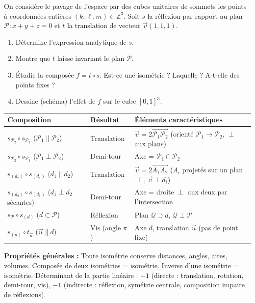 \documentclass[11pt]{article}
\begin{document}
\begin{exercice}
On considère le pavage de l'espace par des cubes unitaires de sommets les points à coordonnées entières $(k,\ell,m)\in\mathbb{Z}^3$. Soit $s$ la réflexion par rapport au plan $\mathcal{P}: x+y+z=0$ et $t$ la translation de vecteur $\vec{v}(1,1,1)$.
\begin{enumerate}
\item Détermine l'expression analytique de $s$.
\item Montre que $t$ laisse invariant le plan $\mathcal{P}$.
\item Étudie la composée $f = t \circ s$. Est-ce une isométrie ? Laquelle ? A-t-elle des points fixes ?
\item Dessine (schéma) l'effet de $f$ sur le cube $[0,1]^3$.
\end{enumerate}
\end{exercice}

\begin{aretenir}
\begin{center}
\begin{tabularx}{\linewidth}{|l|X|X|}\hline
\textbf{Composition} & \textbf{Résultat} & \textbf{Éléments caractéristiques} \\ \hline
$s_{\mathcal{P}_2} \circ s_{\mathcal{P}_1}$ ($\mathcal{P}_1\parallel\mathcal{P}_2$) & Translation & $\vec{v} = 2\overrightarrow{\mathcal{P}_1\mathcal{P}_2}$ (orienté $\mathcal{P}_1\to\mathcal{P}_2$, $\perp$ aux plans) \\ \hline
$s_{\mathcal{P}_2} \circ s_{\mathcal{P}_1}$ ($\mathcal{P}_1\perp\mathcal{P}_2$) & Demi-tour & Axe = $\mathcal{P}_1 \cap \mathcal{P}_2$ \\ \hline
$s_{(d_2)} \circ s_{(d_1)}$ ($d_1\parallel d_2$) & Translation & $\vec{v} = 2\overrightarrow{A_1A_2}$ ($A_i$ projetés sur un plan $\perp$, $\vec{v}\perp d_i$) \\ \hline
$s_{(d_2)} \circ s_{(d_1)}$ ($d_1\perp d_2$ sécantes) & Demi-tour & Axe = droite $\perp$ aux deux par l'intersection \\ \hline
$s_{\mathcal{P}} \circ s_{(d)}$ ($d\subset\mathcal{P}$) & Réflexion & Plan $\mathcal{Q}\supset d$, $\mathcal{Q}\perp\mathcal{P}$ \\ \hline
$s_{(d)} \circ t_{\vec{u}}$ ($\vec{u}\parallel d$) & Vis (angle $\pi$) & Axe $d$, translation $\vec{u}$ (pas de point fixe) \\ \hline
\end{tabularx}
\end{center}
\textbf{Propriétés générales :} Toute isométrie conserve distances, angles, aires, volumes. Composée de deux isométries = isométrie. Inverse d'une isométrie = isométrie. Déterminant de la partie linéaire : $+1$ (directe : translation, rotation, demi-tour, vis), $-1$ (indirecte : réflexion, symétrie centrale, composition impaire de réflexions).
\end{aretenir}
\end{document}
